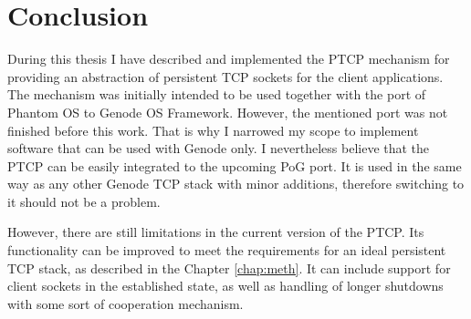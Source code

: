\chapter{Conclusion}
\label{chap:conc}

During this thesis I have described and implemented the PTCP mechanism for
providing an abstraction of persistent TCP sockets for the client applications.
The mechanism was initially intended to be used together with the port of
Phantom OS to Genode OS Framework. However, the mentioned port was not finished
before this work. That is why I narrowed my scope to implement software that
can be used with Genode only. I nevertheless believe that the PTCP can be
easily integrated to the upcoming PoG port. It is used in the same way as any
other Genode TCP stack with minor additions, therefore switching to it should
not be a problem.

However, there are still limitations in the current version of the PTCP. Its
functionality can be improved to meet the requirements for an ideal persistent
TCP stack, as described in the Chapter \ref{chap:meth}. It can include support
for client sockets in the established state, as well as handling of longer
shutdowns with some sort of cooperation mechanism.
